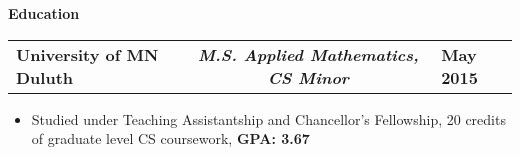 \documentclass[letterpaper,10pt]{article}
\newcommand{\myitem}{\item[$\triangleright$]}
\newcommand{\resHeading}[1]{{
		\begin{tcolorbox}[size=title, sharp corners, colback=mygrey, colframe=mygrey]
			\centering\textbf{\large #1}
		\end{tcolorbox}
	}}
\newcommand{\twoColSubHeading}[2]{
		\begin{tabularx}{\columnwidth}{Xr}
				\textbf{#1} & \textbf{#2}
		\end{tabularx}
	}
\newcommand{\threeColSubHeading}[3]{
		\begin{tabularx}{\textwidth}{XcX}
				\textbf{#1} & \textit{\textbf{#2}}  & \hfill\textbf{#3}
		\end{tabularx}
	}
\begin{document}
	\resHeading{Education}
		\threeColSubHeading{University of MN Duluth}{M.S. Applied Mathematics, CS Minor}{May 2015}
			\begin{itemize}
				\myitem Studied under Teaching Assistantship and Chancellor's Fellowship, 20 credits of graduate level CS coursework, \textbf{GPA: 3.67}
			\end{itemize}
\end{document}

